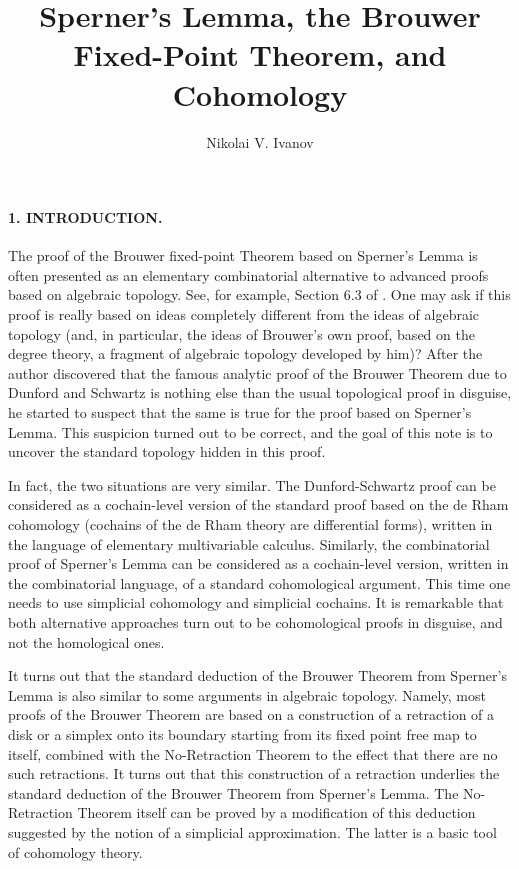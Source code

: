 \documentclass[leqno, 11pt]{article}\usepackage{latexsym}\usepackage{amsmath, amscd}\usepackage{amssymb}
\begin{document}
\title{{\sc Sperner's Lemma, the Brouwer Fixed-Point Theorem, and Cohomology}}
\date{}
\author{\sc Nikolai V. Ivanov}                                                                                                                                                                                                                                                                                        
\renewcommand{\thefootnote}{\fnsymbol{footnote}}


\maketitle

\paragraph{1. INTRODUCTION.} The proof of the Brouwer fixed-point Theorem based on Sperner's Lemma \cite{S} is often presented 
as an elementary combinatorial alternative to advanced proofs based on algebraic topology. See, for example, Section 6.3 of \cite{P1}. 
One may ask if this proof is really based on ideas completely different from the ideas of algebraic topology (and, in particular, the ideas of Brouwer's own proof, based on the degree theory, a fragment of algebraic topology developed by him)? After the author discovered \cite{I} that the famous analytic proof of the Brouwer Theorem due to Dunford and Schwartz is nothing else than the usual topological proof in disguise, he started to suspect that the same is true for the proof based on Sperner's Lemma. This suspicion turned out to be correct, and the goal of this note is to uncover the standard topology hidden in this proof.

In fact, the two situations are very similar. The Dunford-Schwartz proof can be considered as a cochain-level version of the standard proof based on the de Rham cohomology (cochains of the de Rham theory are differential forms), written in the language of elementary multivariable calculus. 
Similarly, the combinatorial proof of Sperner's Lemma can be considered as a cochain-level version, written in the combinatorial language, of a standard cohomological argument. This time one needs to use simplicial cohomology and simplicial cochains. 
It is remarkable that both alternative approaches turn out to be cohomological proofs in disguise, and not the homological ones. 

It turns out that the standard deduction of the Brouwer Theorem from Sperner's Lemma is also similar to some arguments in algebraic topology. 
Namely, most proofs of the Brouwer Theorem are based on a construction of a retraction of a disk or a simplex onto its boundary starting from its fixed point free map to itself, combined with the No-Retraction Theorem to the effect that there are no such retractions. It turns out that this construction of a retraction underlies 
the standard deduction of the Brouwer Theorem from Sperner's Lemma. The No-Retraction Theorem itself can be proved by a modification of this deduction suggested by
the notion of a simplicial approximation. The latter is a basic tool of cohomology theory.\\
\end{document}

